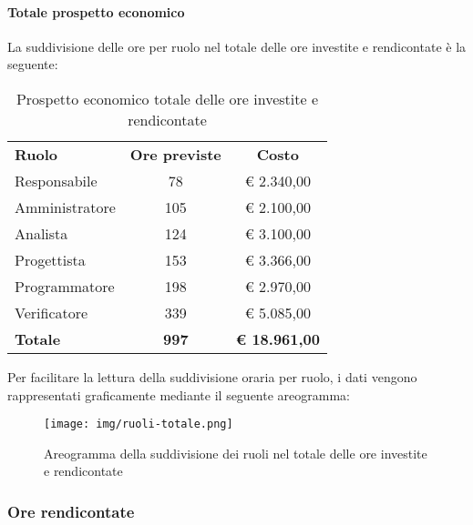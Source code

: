 \documentclass[../piano-di-progetto.tex]{subfiles}
\begin{document}
    \paragraph{Totale prospetto economico}
    La suddivisione delle ore per ruolo nel totale delle ore investite e rendicontate è la seguente:
    \begin{table}[H]
      \centering
      \begin{tabular}{lcc}
        \rowcolor{lightgray}
\textbf{Ruolo}  & \textbf{Ore previste} & \textbf{Costo}       \\
Responsabile    & 78                    & € 2.340,00           \\
Amministratore  & 105                   & € 2.100,00           \\
Analista        & 124                   & € 3.100,00           \\
Progettista     & 153                   & € 3.366,00           \\
Programmatore   & 198                   & € 2.970,00           \\
Verificatore    & 339                   & € 5.085,00           \\
\textbf{Totale} & \textbf{997}          & \textbf{€ 18.961,00}
      \end{tabular}
      \caption{Prospetto economico totale delle ore investite e rendicontate}
    \end{table}

    Per facilitare la lettura della suddivisione oraria per ruolo, i dati vengono rappresentati graficamente mediante il seguente areogramma:
    \begin{figure}[H]
      \centering
      \texttt{[image: img/ruoli-totale.png]}
      \caption{Areogramma della suddivisione dei ruoli nel totale delle ore investite e rendicontate}
      \label{fig:ore-totali}
    \end{figure}


    \subsubsection{Ore rendicontate}
\end{document}
